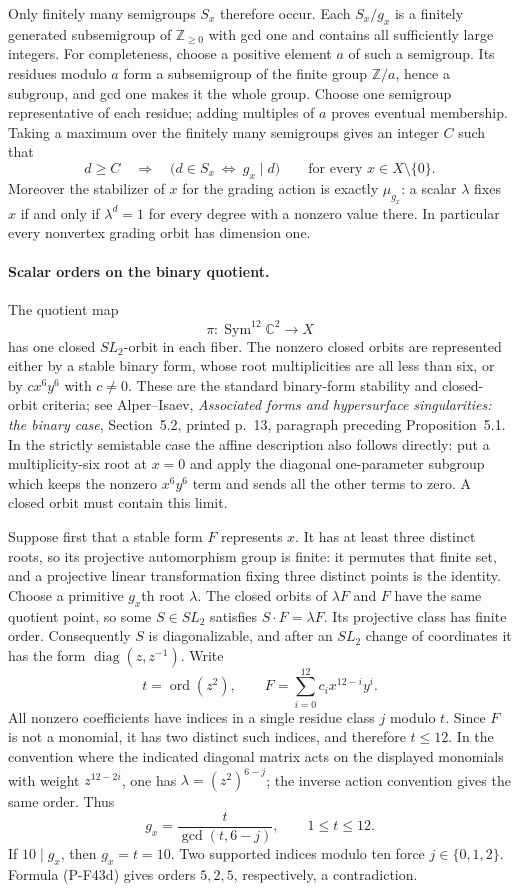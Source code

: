 Only finitely many semigroups $S_x$ therefore occur. Each
$S_x/g_x$ is a finitely generated subsemigroup of
$\mathbb Z_{\ge0}$ with gcd one and contains all sufficiently
large integers. For completeness, choose a positive element
$a$ of such a semigroup. Its residues modulo $a$ form a
subsemigroup of the finite group $\mathbb Z/a$, hence a
subgroup, and gcd one makes it the whole group. Choose one
semigroup representative of each residue; adding multiples
of $a$ proves eventual membership. Taking a maximum over
the finitely many semigroups gives an integer $C$ such that
\[
 d\ge C\quad\Longrightarrow\quad
 \bigl(d\in S_x\ \Longleftrightarrow\ g_x\mid d\bigr)
 \qquad\text{for every }x\in X\setminus\{0\}.
 \tag{P-F43c}
\]
Moreover the stabilizer of $x$ for the grading action is
exactly $\mu_{g_x}$: a scalar $\lambda$ fixes $x$ if and only
if $\lambda^d=1$ for every degree with a nonzero value there.
In particular every nonvertex grading orbit has dimension one.

\paragraph{Scalar orders on the binary quotient.}
The quotient map
\[
 \pi:\operatorname{Sym}^{12}\mathbb C^2\longrightarrow X
\]
has one closed $SL_2$-orbit in each fiber. The nonzero closed
orbits are represented either by a stable binary form, whose
root multiplicities are all less than six, or by
$c x^6y^6$ with $c\ne0$. These are the standard binary-form
stability and closed-orbit criteria; see Alper--Isaev,
\emph{Associated forms and hypersurface singularities: the
binary case}, Section~5.2, printed p.~13, paragraph preceding
Proposition~5.1. In the strictly semistable case the affine
description also follows directly: put a multiplicity-six
root at $x=0$ and apply the diagonal one-parameter subgroup
which keeps the nonzero $x^6y^6$ term and sends all the other
terms to zero. A closed orbit must contain this limit.

Suppose first that a stable form $F$ represents $x$. It has
at least three distinct roots, so its projective automorphism
group is finite: it permutes that finite set, and a projective
linear transformation fixing three distinct points is the
identity. Choose a primitive $g_x$th root $\lambda$.
The closed orbits of $\lambda F$ and $F$ have the same
quotient point, so some $S\in SL_2$ satisfies
$S\cdot F=\lambda F$. Its projective class has finite order.
Consequently $S$ is diagonalizable, and after an $SL_2$
change of coordinates it has the form
$\operatorname{diag}(z,z^{-1})$. Write
\[
 t=\operatorname{ord}(z^2),\qquad
 F=\sum_{i=0}^{12}c_i x^{12-i}y^i.
\]
All nonzero coefficients have indices in a single residue
class $j$ modulo $t$. Since $F$ is not a monomial, it has
two distinct such indices, and therefore $t\le12$.
In the convention where the indicated diagonal matrix acts
on the displayed monomials with weight $z^{12-2i}$, one has
$\lambda=(z^2)^{6-j}$; the inverse action convention gives
the same order. Thus
\[
               g_x=\frac{t}{\gcd(t,6-j)},\qquad 1\le t\le12.
 \tag{P-F43d}
\]
If $10\mid g_x$, then $g_x=t=10$. Two supported indices
modulo ten force $j\in\{0,1,2\}$. Formula (P-F43d) gives
orders $5,2,5$, respectively, a contradiction.

